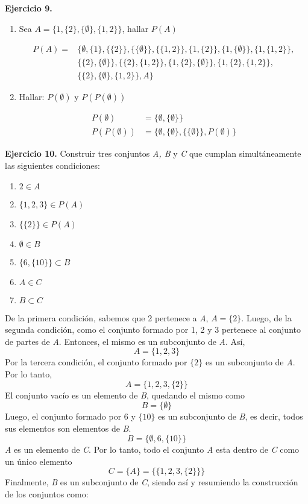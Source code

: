 \textbf{Ejercicio 9.}
\begin{enumerate}
	\item Sea $A = \{1, \{2\}, \{\emptyset\}, \{1, 2\}\}$, hallar $P(A)$
	
	\begin{align*}
		P(A) =& \{ \emptyset, \{1\}, \{\{2\}\}, \{\{\emptyset\}\}, \{\{1, 2\}\}, \{1, \{2\}\}, \{1, \{\emptyset\}\}, \{1, \{1, 2\}\}, \\
		&\{\{2\}, \{\emptyset\}\}, \{\{2\}, \{1, 2\}\}, \{1, \{2\}, \{\emptyset\}\}, \{1, \{2\}, \{1, 2\}\},\\
		&\{\{2\}, \{\emptyset\}, \{1, 2\}\}, A \} 
	\end{align*}

	\item Hallar: $P(\emptyset)$ y $P(P(\emptyset))$
	
	\begin{align*}
		P(\emptyset) &= \{\emptyset, \{\emptyset\}\}\\
		P(P(\emptyset)) &= \{\emptyset, \{\emptyset\}, \{\{\emptyset\}\}, P(\emptyset)\}
	\end{align*}
\end{enumerate}

\textbf{Ejercicio 10.} Construir tres conjuntos \textit{A, B} y \textit{C} que cumplan simult\'aneamente las siguientes condiciones:
\begin{multicols}{3}
\begin{enumerate}
	\item $2 \in A$
	\item $\{1, 2, 3\} \in P(A)$
	\item $\{\{2\}\} \in P(A)$
	\item $\emptyset \in B$
	\item $\{6, \{10\}\} \subset B$
	\item $A \in C$
	\item $B \subset C$
\end{enumerate}
\end{multicols}

De la primera condici\'on, sabemos que 2 pertenece a \textit{A}, $A = \{2\}$. Luego, de la segunda condici\'on, como el conjunto formado por 1, 2 y 3 pertenece al conjunto de partes de \textit{A}. Entonces, el mismo es un subconjunto de \textit{A}. As\'i, $$A = \{1, 2, 3\}$$ Por la tercera condici\'on, el conjunto formado por $\{2\}$ es un subconjunto de \textit{A}. Por lo tanto, $$A = \{1, 2, 3, \{2\}\}$$ El conjunto vac\'io es un elemento de \textit{B}, quedando el mismo como $$B = \{\emptyset\}$$ Luego, el conjunto formado por 6 y $\{10\}$ es un subconjunto de \textit{B}, es decir, todos sus elementos son elementos de \textit{B}. $$B = \{\emptyset, 6, \{10\}\}$$ \textit{A} es un elemento de \textit{C}. Por lo tanto, todo el conjunto \textit{A} esta dentro de \textit{C} como un \'unico elemento $$C = \{A\} = \{\{1, 2, 3, \{2\}\}\}$$ Finalmente, \textit{B} es un subconjunto de \textit{C}, siendo as\'i y resumiendo la construcci\'on de los conjuntos como:

